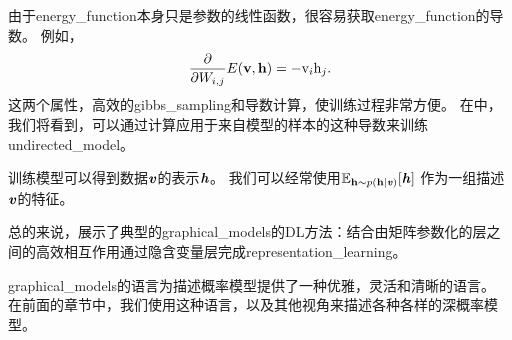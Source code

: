 由于\gls{energy_function}本身只是参数的线性函数，很容易获取\gls{energy_function}的导数。 例如，
\begin{align}
\label{eqn:1615}
\frac{\partial}{\partial W_{i,j}} E(\mathbf{v},\mathbf{h}) = - \mathrm{v}_i \mathrm{h}_j.
\end{align}
这两个属性，高效的\gls{gibbs_sampling}和导数计算，使训练过程非常方便。
在中，我们将看到，可以通过计算应用于来自模型的样本的这种导数来训练\gls{undirected_model}。

训练模型可以得到数据$\boldsymbol{\mathit{v}}$的表示$\boldsymbol{\mathit{h}}$。
我们可以经常使用$\mathbb{E}_{\mathbf{h}\sim p(\mathbf{h}\mid\boldsymbol{\mathit{v}})}[\boldsymbol{\mathit{h}}]$ 作为一组描述$\boldsymbol{\mathit{v}}$的特征。



总的来说，展示了典型的\gls{graphical_models}的\gls{DL}方法：结合由矩阵参数化的层之间的高效相互作用通过隐含变量层完成\gls{representation_learning}。


\gls{graphical_models}的语言为描述概率模型提供了一种优雅，灵活和清晰的语言。 在前面的章节中，我们使用这种语言，以及其他视角来描述各种各样的深概率模型。




